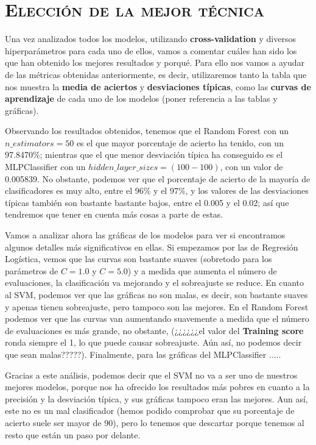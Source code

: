 \documentclass[11pt,a4paper]{article}
\begin{document}
\section{\textsc{Elección de la mejor técnica}}

Una vez analizados todos los modelos, utilizando \textbf{cross-validation} y diversos hiperparámetros para cada uno de ellos, vamos a comentar cuáles han sido los que han obtenido los mejores resultados y porqué. Para ello nos vamos a ayudar de las métricas obtenidas anteriormente, es decir, utilizaremos tanto la tabla que nos muestra la \textbf{media de aciertos} y \textbf{desviaciones típicas}, como las \textbf{curvas de aprendizaje} de cada uno de los modelos (poner referencia a las tablas y gráficas).

Observando los resultados obtenidos, tenemos que el Random Forest con un $n\_estimators = 50$ es el que mayor porcentaje de acierto ha tenido, con un 97.8470\%; mientras que el que menor desviación típica ha conseguido es el MLPClassifier con un $hidden\_layer\_sizes = (100-100)$, con un valor de 0.005839. No obstante, podemos ver que el porcentaje de acierto de la mayoría de clasificadores es muy alto, entre el 96\% y el 97\%, y los valores de las desviaciones típicas también son bastante bastante bajos, entre el 0.005 y el 0.02; así que tendremos que tener en cuenta más cosas a parte de estas.

Vamos a analizar ahora las gráficas de los modelos para ver si encontramos algunos detalles más significativos en ellas. Si empezamos por las de Regresión Logística, vemos que las curvas son bastante suaves (sobretodo para los parámetros de $C = 1.0$ y $C = 5.0$) y a medida que aumenta el número de evaluaciones, la clasificación va mejorando y el sobreajuste se reduce. En cuanto al SVM, podemos ver que las gráficas no son malas, es decir, son bastante suaves y apenas tienen sobreajuste, pero tampoco son las mejores. En el Random Forest podemos ver que las curvas van aumentando suavemente a medida que el número de evaluaciones es más grande, no obstante, (¿¿¿¿¿¿el valor del \textbf{Training score} ronda siempre el 1, lo que puede causar sobreajuste. Aún así, no podemos decir que sean malas?????). Finalmente, para las gráficas del MLPClassifier .....

Gracias a este análisis, podemos decir que el SVM no va a ser uno de nuestros mejores modelos, porque nos ha ofrecido los resultados más pobres en cuanto a la precisión y la desviación típica, y sus gráficas tampoco eran las mejores. Aun así, este no es un mal clasificador (hemos podido comprobar que su porcentaje de acierto suele ser mayor de 90), pero lo tenemos que descartar porque tenemos al resto que están un paso por delante.
\end{document}
